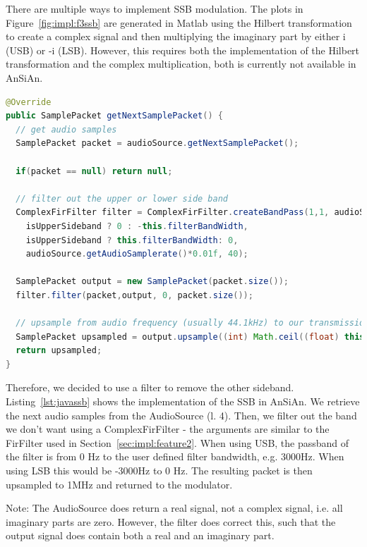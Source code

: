 There are multiple ways to implement SSB modulation. The plots in Figure~\ref{fig:impl:f3ssb} are generated in Matlab using the Hilbert transformation to create a complex signal and then multiplying the imaginary part by either i (USB) or -i (LSB). However, this requires both the implementation of the Hilbert transformation and the complex multiplication, both is currently not available in AnSiAn. 

\begin{lstlisting}[label=lst:javassb, caption=Modulating Microphone Samples using SSB, language=java,]
@Override
public SamplePacket getNextSamplePacket() {
  // get audio samples
  SamplePacket packet = audioSource.getNextSamplePacket();
	
  if(packet == null) return null;
	
  // filter out the upper or lower side band
  ComplexFirFilter filter = ComplexFirFilter.createBandPass(1,1, audioSource.getAudioSamplerate(),
	isUpperSideband ? 0 : -this.filterBandWidth,
	isUpperSideband ? this.filterBandWidth: 0,
	audioSource.getAudioSamplerate()*0.01f, 40);
	
  SamplePacket output = new SamplePacket(packet.size());
  filter.filter(packet,output, 0, packet.size());
	
  // upsample from audio frequency (usually 44.1kHz) to our transmission frequency (1MHz)
  SamplePacket upsampled = output.upsample((int) Math.ceil((float) this.sampleRate / audioSource.getAudioSamplerate()));
  return upsampled;
}
\end{lstlisting}


Therefore, we decided to use a filter to remove the other sideband. Listing~\ref{lst:javassb} shows the implementation of the SSB in AnSiAn. We retrieve the next audio samples from the AudioSource (l. 4). Then, we filter out the band we don't want using a ComplexFirFilter - the arguments are similar to the FirFilter used in Section~\ref{sec:impl:feature2}. When using USB, the passband of the filter is from 0 Hz to the user defined filter bandwidth, e.g. 3000Hz. When using LSB this would be -3000Hz to 0 Hz. The resulting packet is then upsampled to 1MHz and returned to the modulator. 

Note: The AudioSource does return a real signal, not a complex signal, i.e. all imaginary parts are zero. However, the filter does correct this, such that the output signal does contain both a real and an imaginary part.

\newpage
